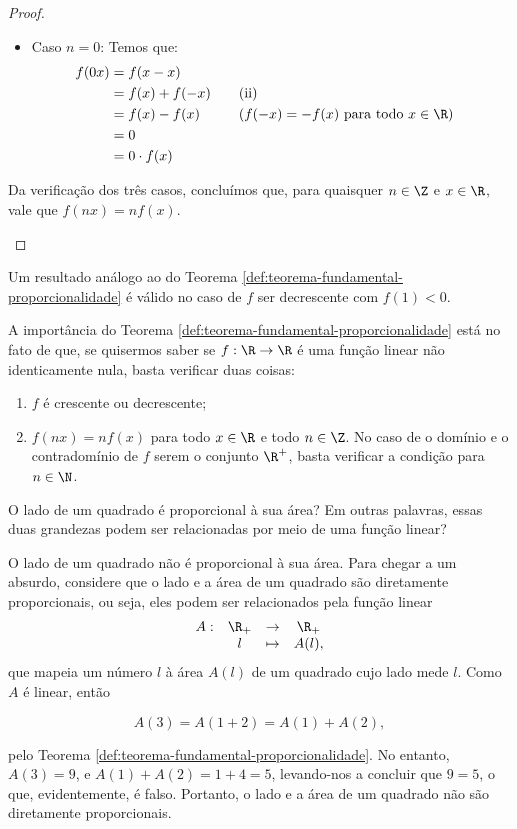\begin{proof}
\begin{itemize}
\begin{itemize}
      \item Caso $n=0$: Temos que:
      \begin{alignat*}{3}
        f(0x) &= f(x-x) \\
        &= f(x)+f(-x) && \quad\text{(ii)}\\
        &= f(x)-f(x) && \quad\text{($f(-x) = -f(x)$ para todo $x \in \R$)}\\
        &= 0\\
        &= 0 \cdot f(x)
      \end{alignat*}
    \end{itemize}

    Da verificação dos três casos, concluímos que, para quaisquer $n\in\Z$ e $x\in\R$, vale que $f(nx)=nf(x)$.
  \end{itemize}
\end{proof}

\begin{remark}
    Um resultado análogo ao do Teorema \ref{def:teorema-fundamental-proporcionalidade} é válido
    no caso de $f$ ser decrescente com $f(1) < 0$.
\end{remark}

A importância do Teorema \ref{def:teorema-fundamental-proporcionalidade} 
está no fato de que, se quisermos saber se $f: \R \to \R$ é uma função linear não identicamente nula,
basta verificar duas coisas:
%
\begin{enumerate}[1.]
  \item $f$ é crescente ou decrescente;
  \item $f(nx) = n f(x)$ para todo $x \in \R$ e todo $n \in \Z$. No
  caso de o domínio e o contradomínio de $f$ serem o conjunto $\R^+$, basta verificar a condição
  para $n \in \N$.
\end{enumerate}

\begin{example}
O lado de um quadrado é proporcional à sua área? Em outras palavras,
essas duas grandezas podem ser relacionadas por meio de uma função
linear?
\end{example}

\begin{solution}
  O lado de um quadrado não é proporcional à sua área.
  Para chegar a um absurdo, 
  considere que o lado e a área de um quadrado são diretamente proporcionais, ou seja, eles podem
  ser relacionados pela função linear
  \begin{equation*}
  \begin{array}{cccc}
    A : & \R_+ & \to     & \R_+ \\
        &  l & \mapsto & A(l),
  \end{array}
  \end{equation*}
  que mapeia um número $l$ à área $A(l)$ de um quadrado cujo lado mede $l$.
  Como $A$ é linear, então

  $$A(3) = A(1+2)=A(1)+A(2),$$

  \noindent pelo Teorema \ref{def:teorema-fundamental-proporcionalidade}. 
  No entanto, $A(3) = 9$, e $A(1)+A(2) = 1+4 = 5$, levando-nos a concluir que $9=5$, o que, evidentemente,
  é falso. Portanto, o lado e a área de um quadrado não são diretamente proporcionais.
\end{solution}